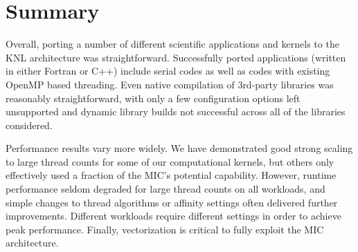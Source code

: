 \section{Summary}
\label{sec:summary}

%
%
Overall, porting a number of different scientific applications and
kernels to the KNL architecture was
straightforward. Successfully ported applications (written in either
Fortran or C++) include serial codes as well as codes with existing
OpenMP based threading. Even native compilation of 3rd-party
libraries was reasonably straightforward, with only a few
configuration options left unsupported and dynamic library builds not
successful across all of the libraries considered.

Performance results vary more widely.
We have demonstrated good strong scaling to large thread counts for some of our computational
kernels, but others only effectively used a fraction of the MIC's
potential capability.  However, runtime performance seldom degraded
for large thread counts on all workloads, and simple changes to
thread algorithms or affinity settings often delivered further
improvements.  Different workloads require different settings in order
to achieve peak performance. Finally, vectorization is critical to
fully exploit the MIC architecture.

